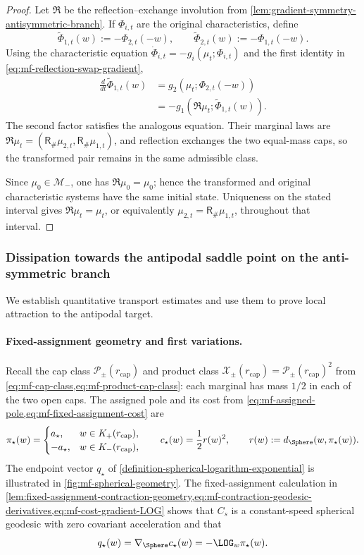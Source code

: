 \begin{proof}
Let \(\mathfrak R\) be the reflection--exchange involution from
\cref{lem:gradient-symmetry-antisymmetric-branch}.  If
\(\Phi_{i,t}\) are the original characteristics, define
\[
 \widetilde\Phi_{1,t}(w):=-\Phi_{2,t}(-w),\qquad
 \widetilde\Phi_{2,t}(w):=-\Phi_{1,t}(-w).
\]
Using the characteristic equation
\(\dot\Phi_{i,t}=-g_i(\mu_t;\Phi_{i,t})\) and the first identity in
\cref{eq:mf-reflection-swap-gradient},
\[
\begin{aligned}
 \frac d{dt}\widetilde\Phi_{1,t}(w)
 &=g_2(\mu_t;\Phi_{2,t}(-w))\\
 &=-g_1(\mathfrak R\mu_t;\widetilde\Phi_{1,t}(w)).
\end{aligned}
\]
The second factor satisfies the analogous equation.  Their marginal laws are
\(\mathfrak R\mu_t=(\mathsf R_\#\mu_{2,t},\mathsf R_\#\mu_{1,t})\), and
reflection exchanges the two equal-mass caps, so the transformed pair remains
in the same admissible class.

Since \(\mu_0\in\mathcal M_-\), one has \(\mathfrak R\mu_0=\mu_0\); hence
the transformed and original characteristic systems have the same initial
state.  Uniqueness on the stated interval gives
\(\mathfrak R\mu_t=\mu_t\), or equivalently
\(\mu_{2,t}=\mathsf R_\#\mu_{1,t}\), throughout that interval.
\end{proof}

\subsubsection{Dissipation towards the antipodal saddle point on the anti-symmetric branch}
\label{subsubsec:diddipation}

We establish quantitative transport estimates and use them to prove local attraction to the antipodal target.

\paragraph{Fixed-assignment geometry and first variations.}
Recall the cap class \(\mathcal P_\pm(r_{\mathrm{cap}})\) and product
class \(\mathcal X_\pm(r_{\mathrm{cap}})=\mathcal P_\pm(r_{\mathrm{cap}})^2\)
from \cref{eq:mf-cap-class,eq:mf-product-cap-class}: each marginal has
mass \(1/2\) in each of the two open caps. The assigned pole and its cost
from \cref{eq:mf-assigned-pole,eq:mf-fixed-assignment-cost} are
\[
 \pi_\star(w)=\begin{cases}a_\star,&w\in K_+(r_{\mathrm{cap}}),\\
                         -a_\star,&w\in K_-(r_{\mathrm{cap}}),\end{cases}
 \qquad c_\star(w)=\frac12 r(w)^2,\qquad
 r(w):=d_\Sphere(w,\pi_\star(w)).
\]
The endpoint vector \(q_\star\) of
\cref{definition-spherical-logarithm-exponential} is illustrated in
\cref{fig:mf-spherical-geometry}.  The fixed-assignment calculation in
\cref{lem:fixed-assignment-contraction-geometry,eq:mf-contraction-geodesic-derivatives,eq:mf-cost-gradient-LOG}
shows that \(C_s\) is a constant-speed spherical geodesic with zero
covariant acceleration and that
\[
 q_\star(w)=\nabla_\Sphere c_\star(w)=-\LOG_w\pi_\star(w).
\]

